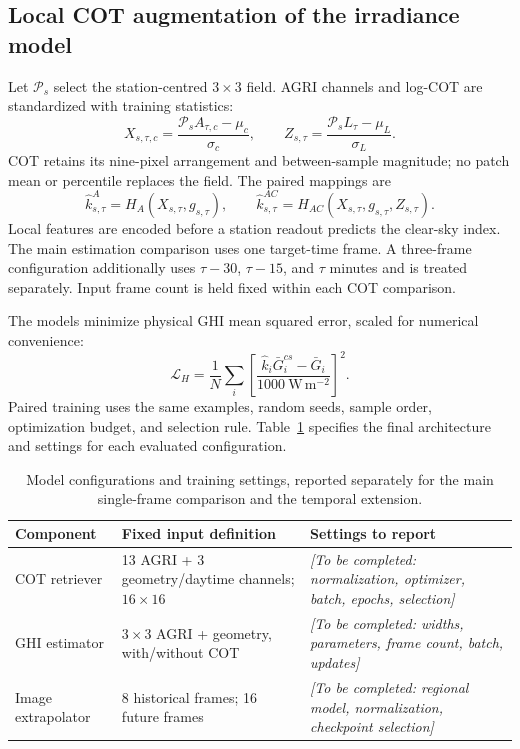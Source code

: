 \documentclass[11pt]{article}
\newcommand{\pending}[1]{\textit{[To be completed: #1]}}
\begin{document}
\subsection{Local COT augmentation of the irradiance model}
Let $\mathcal P_s$ select the station-centred $3\times3$ field. AGRI channels and log-COT are standardized with training statistics:
\begin{equation}
X_{s,\tau,c}=\frac{\mathcal P_sA_{\tau,c}-\mu_c}{\sigma_c},\qquad
Z_{s,\tau}=\frac{\mathcal P_sL_\tau-\mu_L}{\sigma_L}.
\label{eq:standardization}
\end{equation}
COT retains its nine-pixel arrangement and between-sample magnitude; no patch mean or percentile replaces the field. The paired mappings are
\begin{equation}
\widehat k^A_{s,\tau}=H_A(X_{s,\tau},g_{s,\tau}),\qquad
\widehat k^{AC}_{s,\tau}=H_{AC}(X_{s,\tau},g_{s,\tau},Z_{s,\tau}).
\label{eq:heads}
\end{equation}
Local features are encoded before a station readout predicts the clear-sky index. The main estimation comparison uses one target-time frame. A three-frame configuration additionally uses $\tau-30$, $\tau-15$, and $\tau$ minutes and is treated separately. Input frame count is held fixed within each COT comparison.

The models minimize physical GHI mean squared error, scaled for numerical convenience:
\begin{equation}
\mathcal L_H=\frac1N\sum_i\left[\frac{\widehat k_i\bar G^{cs}_i-\bar G_i}{1000\ \mathrm{W\,m^{-2}}}\right]^2.
\label{eq:ghi-loss}
\end{equation}
Paired training uses the same examples, random seeds, sample order, optimization budget, and selection rule. Table~\ref{tab:training} specifies the final architecture and settings for each evaluated configuration.
\begin{table}[!htbp]\centering\small
\caption{Model configurations and training settings, reported separately for the main single-frame comparison and the temporal extension.}\label{tab:training}
\begin{tabularx}{\linewidth}{lXX}\toprule
Component & Fixed input definition & Settings to report\\\midrule
COT retriever & 13 AGRI + 3 geometry/daytime channels; $16\times16$ & \pending{normalization, optimizer, batch, epochs, selection}\\
GHI estimator & $3\times3$ AGRI + geometry, with/without COT & \pending{widths, parameters, frame count, batch, updates}\\
Image extrapolator & 8 historical frames; 16 future frames & \pending{regional model, normalization, checkpoint selection}\\\bottomrule
\end{tabularx}\end{table}
\end{document}
